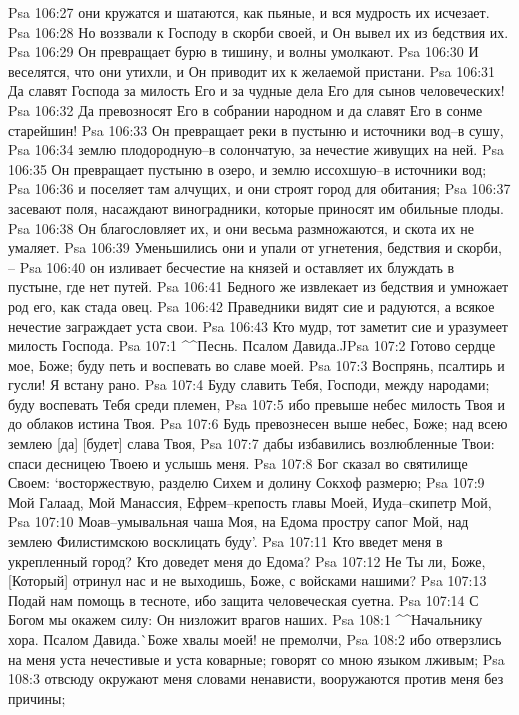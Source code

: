 Psa 106:27  они кружатся и шатаются, как пьяные, и вся мудрость их исчезает.
Psa 106:28  Но воззвали к Господу в скорби своей, и Он вывел их из бедствия их.
Psa 106:29  Он превращает бурю в тишину, и волны умолкают.
Psa 106:30  И веселятся, что они утихли, и Он приводит их к желаемой пристани.
Psa 106:31  Да славят Господа за милость Его и за чудные дела Его для сынов человеческих!
Psa 106:32  Да превозносят Его в собрании народном и да славят Его в сонме старейшин!
Psa 106:33  Он превращает реки в пустыню и источники вод--в сушу,
Psa 106:34  землю плодородную--в солончатую, за нечестие живущих на ней.
Psa 106:35  Он превращает пустыню в озеро, и землю иссохшую--в источники вод;
Psa 106:36  и поселяет там алчущих, и они строят город для обитания;
Psa 106:37  засевают поля, насаждают виноградники, которые приносят им обильные плоды.
Psa 106:38  Он благословляет их, и они весьма размножаются, и скота их не умаляет.
Psa 106:39  Уменьшились они и упали от угнетения, бедствия и скорби, --
Psa 106:40  он изливает бесчестие на князей и оставляет их блуждать в пустыне, где нет путей.
Psa 106:41  Бедного же извлекает из бедствия и умножает род его, как стада овец.
Psa 106:42  Праведники видят сие и радуются, а всякое нечестие заграждает уста свои.
Psa 106:43  Кто мудр, тот заметит сие и уразумеет милость Господа.
Psa 107:1  ^^Песнь. Псалом Давида.^^
Psa 107:2  Готово сердце мое, Боже; буду петь и воспевать во славе моей.
Psa 107:3  Воспрянь, псалтирь и гусли! Я встану рано.
Psa 107:4  Буду славить Тебя, Господи, между народами; буду воспевать Тебя среди племен,
Psa 107:5  ибо превыше небес милость Твоя и до облаков истина Твоя.
Psa 107:6  Будь превознесен выше небес, Боже; над всею землею [да] [будет] слава Твоя,
Psa 107:7  дабы избавились возлюбленные Твои: спаси десницею Твоею и услышь меня.
Psa 107:8  Бог сказал во святилище Своем: `восторжествую, разделю Сихем и долину Сокхоф размерю;
Psa 107:9  Мой Галаад, Мой Манассия, Ефрем--крепость главы Моей, Иуда--скипетр Мой,
Psa 107:10  Моав--умывальная чаша Моя, на Едома простру сапог Мой, над землею Филистимскою восклицать буду'.
Psa 107:11  Кто введет меня в укрепленный город? Кто доведет меня до Едома?
Psa 107:12  Не Ты ли, Боже, [Который] отринул нас и не выходишь, Боже, с войсками нашими?
Psa 107:13  Подай нам помощь в тесноте, ибо защита человеческая суетна.
Psa 107:14  С Богом мы окажем силу: Он низложит врагов наших.
Psa 108:1  ^^Начальнику хора. Псалом Давида.^^ Боже хвалы моей! не премолчи,
Psa 108:2  ибо отверзлись на меня уста нечестивые и уста коварные; говорят со мною языком лживым;
Psa 108:3  отвсюду окружают меня словами ненависти, вооружаются против меня без причины;
